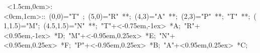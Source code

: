 

\hbox{
\xy    <1.5cm,0cm>:<0cm,1cm>::
       (0,0)="T" ; (5,0)="R" **\dir{-}; 
       (4,3)="A" **\dir{-};  (2,3)="P" **\dir{-}; "T" **\dir{-};
       (1,1.5)="M"; (4.5,1.5)="N" **\dir{-};
       "T"+<-0.75em,-1ex> *{A};
       "R"+<0.95em,-1ex> *{D};
       "M"+<-0.95em,0.25ex> *{E};
       "N"+<0.95em,0.25ex> *{F};
       "P"+<-0.95em,0.25ex> *{B};
       "A"+<0.95em,0.25ex> *{C};
\endxy}
	   
